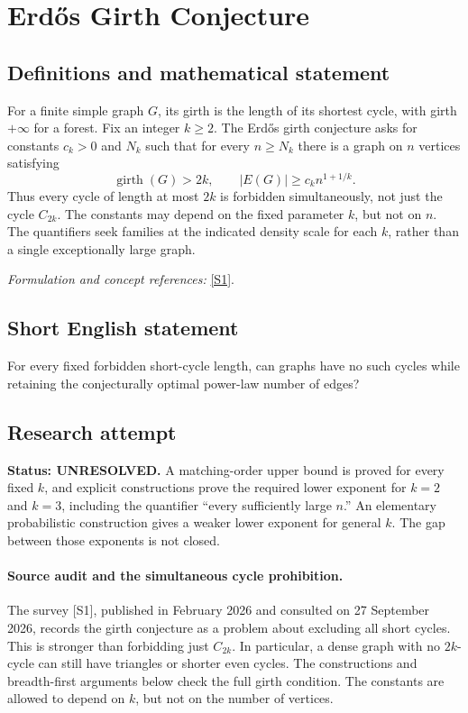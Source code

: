 \documentclass[11pt]{article}
\begin{document}
\section*{\texorpdfstring{Erdős Girth Conjecture}{Erdős Girth Conjecture}}\label{statement}
\subsection{Definitions and mathematical statement}
For a finite simple graph $G$, its girth is the length of its shortest cycle, with girth $+\infty$ for a forest. Fix an integer $k\ge2$. The Erd\H{o}s girth conjecture asks for constants $c_k>0$ and $N_k$ such that for every $n\ge N_k$ there is a graph on $n$ vertices satisfying
\[
 \operatorname{girth}(G)>2k,
 \qquad |E(G)|\ge c_k n^{1+1/k}.
\]
Thus every cycle of length at most $2k$ is forbidden simultaneously, not just the cycle $C_{2k}$. The constants may depend on the fixed parameter $k$, but not on $n$. The quantifiers seek families at the indicated density scale for each $k$, rather than a single exceptionally large graph.
\par\smallskip\textit{Formulation and concept references:} \href{https://www.combinatorics.org/ojs/index.php/eljc/article/download/ds27/pdf}{[S1]}.

\subsection{Short English statement}
For every fixed forbidden short-cycle length, can graphs have no such cycles while retaining the conjecturally optimal power-law number of edges?
\subsection{Research attempt}
\textbf{Status: UNRESOLVED.} A matching-order upper bound is proved for every fixed $k$, and explicit constructions prove the required lower exponent for $k=2$ and $k=3$, including the quantifier ``every sufficiently large $n$.'' An elementary probabilistic construction gives a weaker lower exponent for general $k$. The gap between those exponents is not closed.

\paragraph{Source audit and the simultaneous cycle prohibition.}
The survey [S1], published in February 2026 and consulted on 27 September 2026, records the girth conjecture as a problem about excluding all short cycles. This is stronger than forbidding just $C_{2k}$. In particular, a dense graph with no $2k$-cycle can still have triangles or shorter even cycles. The constructions and breadth-first arguments below check the full girth condition. The constants are allowed to depend on $k$, but not on the number of vertices.
\end{document}

